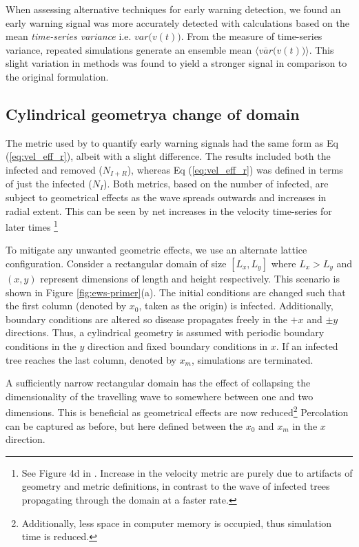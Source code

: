 When assessing alternative techniques for early warning detection, we found an early warning signal was more accurately %
detected with calculations based on the mean \textit{time-series variance} i.e. $var\big(v(t) \big)$. %
From the measure of time-series variance, repeated simulations generate an ensemble mean $\langle \overline{var}\big(v(t) \big)\rangle$. %
This slight variation in methods was found to yield a stronger signal in comparison to the original formulation. %

\subsection{Cylindrical geometry\textemdash a change of domain}

The metric used by \cite{OROZCOFUENTES201912} to quantify early warning signals had the same form as Eq (\ref{eq:vel_eff_r}), albeit with a slight difference. %
The results included both the infected and removed ($N_{I+R}$), whereas Eq (\ref{eq:vel_eff_r}) %
was defined in terms of just the infected ($N_I$). %
Both metrics, based on the number of infected, are subject to geometrical effects as the wave %
spreads outwards and increases in radial extent. %
This can be seen by net increases in the velocity time-series for later times %
\footnote{See Figure 4d in \cite{OROZCOFUENTES201912}. Increase in the velocity metric are purely due to artifacts of geometry and metric definitions, in contrast to the wave of infected trees propagating through the domain at a faster rate.}

To mitigate any unwanted geometric effects, %
we use an alternate lattice configuration. %
Consider a rectangular domain of size $[L_x, L_y]$ where $L_x>L_y$ and $(x, y)$ represent dimensions %
of length and height respectively. This scenario is shown in Figure \ref{fig:ews-primer}(a). %
The initial conditions are changed such that the first column (denoted by $x_0$, taken as the origin) is infected. %
Additionally, boundary conditions are altered so disease propagates freely in the $+x$ and $\pm y$ directions. %
Thus, a cylindrical geometry is assumed with periodic boundary conditions in the $y$ direction and fixed boundary conditions in $x$. %
If an infected tree reaches the last column, denoted by $x_m$, simulations are terminated. %

A sufficiently narrow rectangular domain has the effect of collapsing the dimensionality of the travelling wave to somewhere between one and two dimensions. %
This is beneficial as geometrical effects are now reduced\footnote{Additionally, less space in computer memory is occupied, thus simulation time is reduced.} %
Percolation can be captured as before, but here defined between the $x_0$ and $x_m$ in the $x$ direction. %

